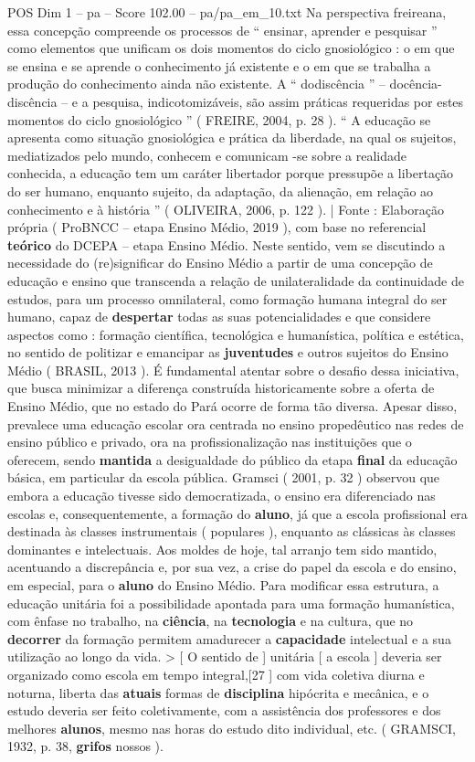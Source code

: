 \begin{textsample}{POS Dim 1 – pa – Score 102.00 – pa/pa\_em\_10.txt}
Na perspectiva freireana, essa concepção compreende os processos de “ ensinar, aprender e pesquisar ” como elementos que unificam os dois momentos do ciclo gnosiológico : o em que se ensina e se aprende o conhecimento já existente e o em que se trabalha a produção do conhecimento ainda não existente.
A “ dodiscência ” – docência-discência – e a pesquisa, indicotomizáveis, são assim práticas requeridas por estes momentos do ciclo gnosiológico ” ( FREIRE, 2004, p. 28 ). “ A educação se apresenta como situação gnosiológica e prática da liberdade, na qual os sujeitos, mediatizados pelo mundo, conhecem e comunicam -se sobre a realidade conhecida, a educação tem um caráter libertador porque pressupõe a libertação do ser humano, enquanto sujeito, da adaptação, da alienação, em relação ao conhecimento e à história ” ( OLIVEIRA, 2006, p. 122 ). | Fonte : Elaboração própria ( ProBNCC – etapa Ensino Médio, 2019 ), com base no referencial \textbf{teórico} do DCEPA – etapa Ensino Médio.
Neste sentido, vem se discutindo a necessidade do (re)significar do Ensino Médio a partir de uma concepção de educação e ensino que transcenda a relação de unilateralidade da continuidade de estudos, para um processo omnilateral, como formação humana integral do ser humano, capaz de \textbf{despertar} todas as suas potencialidades e que considere aspectos como : formação científica, tecnológica e humanística, política e estética, no sentido de politizar e emancipar as \textbf{juventudes} e outros sujeitos do Ensino Médio ( BRASIL, 2013 ).
É fundamental atentar sobre o desafio dessa iniciativa, que busca minimizar a diferença construída historicamente sobre a oferta de Ensino Médio, que no estado do Pará ocorre de forma tão diversa.
Apesar disso, prevalece uma educação escolar ora centrada no ensino propedêutico nas redes de ensino público e privado, ora na profissionalização nas instituições que o oferecem, sendo \textbf{mantida} a desigualdade do público da etapa \textbf{final} da educação básica, em particular da escola pública.
Gramsci ( 2001, p. 32 ) observou que embora a educação tivesse sido democratizada, o ensino era diferenciado nas escolas e, consequentemente, a formação do \textbf{aluno}, já que a escola profissional era destinada às classes instrumentais ( populares ), enquanto as clássicas às classes dominantes e intelectuais.
Aos moldes de hoje, tal arranjo tem sido mantido, acentuando a discrepância e, por sua vez, a crise do papel da escola e do ensino, em especial, para o \textbf{aluno} do Ensino Médio.
Para modificar essa estrutura, a educação unitária foi a possibilidade apontada para uma formação humanística, com ênfase no trabalho, na \textbf{ciência}, na \textbf{tecnologia} e na cultura, que no \textbf{decorrer} da formação permitem amadurecer a \textbf{capacidade} intelectual e a sua utilização ao longo da vida. > [ O sentido de ] unitária [ a escola ] deveria ser organizado como escola em tempo integral,[27 ] com vida coletiva diurna e noturna, liberta das \textbf{atuais} formas de \textbf{disciplina} hipócrita e mecânica, e o estudo deveria ser feito coletivamente, com a assistência dos professores e dos melhores \textbf{alunos}, mesmo nas horas do estudo dito individual, etc. ( GRAMSCI, 1932, p. 38, \textbf{grifos} nossos ).

\end{textsample}

